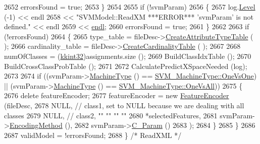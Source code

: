 \begin{DoxyCode}
2652     errorsFound = \textcolor{keyword}{true};
2653   \}
2654 
2655   \textcolor{keywordflow}{if}  (!svmParam)
2656   \{
2657    log.\hyperlink{class_k_k_b_1_1_run_log_a32cf761d7f2e747465fd80533fdbb659}{Level} (-1) << endl 
2658      << \textcolor{stringliteral}{"SVMModel::ReadXM   ***ERROR***   'svmParam' is not defined."} << endl
2659      << \hyperlink{namespace_k_k_b_ad1f50f65af6adc8fa9e6f62d007818a8}{endl};
2660     errorsFound = \textcolor{keyword}{true};
2661   \}
2662 
2663   \textcolor{keywordflow}{if}  (!errorsFound)
2664   \{
2665     type\_table        = fileDesc->\hyperlink{class_k_k_m_l_l_1_1_file_desc_a924736ac68c054c64001fe836ba7c1e3}{CreateAttributeTypeTable} ( );
2666     cardinality\_table = fileDesc->\hyperlink{class_k_k_m_l_l_1_1_file_desc_a1f16b3ad912b04745baa9eea8d3111c7}{CreateCardinalityTable} ( );
2667 
2668     numOfClasses = (\hyperlink{namespace_k_k_b_a8fa4952cc84fda1de4bec1fbdd8d5b1b}{kkint32})assignments.size ();
2669     BuildClassIdxTable ();
2670     BuildCrossClassProbTable ();
2671 
2672     CalculatePredictXSpaceNeeded (log);
2673 
2674     \textcolor{keywordflow}{if}  ((svmParam->\hyperlink{class_k_k_m_l_l_1_1_s_v_mparam_a30153e00007f9cf65343e0ad97ad61fb}{MachineType} () ==  \hyperlink{namespace_k_k_m_l_l_ad917464bc631109a3021cf02cd27af9aa2cb1a8e8122853731a8eb99f1bd56630}{SVM\_MachineType::OneVsOne})  ||  
      (svmParam->\hyperlink{class_k_k_m_l_l_1_1_s_v_mparam_a30153e00007f9cf65343e0ad97ad61fb}{MachineType} () == \hyperlink{namespace_k_k_m_l_l_ad917464bc631109a3021cf02cd27af9aa0bf7132f9ec5b2de535b831afd3ae75c}{SVM\_MachineType::OneVsAll}))
2675     \{
2676       \textcolor{keyword}{delete}  featureEncoder;
2677       featureEncoder = \textcolor{keyword}{new} \hyperlink{class_k_k_m_l_l_1_1_feature_encoder}{FeatureEncoder} (fileDesc,
2678                                            NULL,              \textcolor{comment}{// class1, set to NULL because we are dealing
       with all classes}
2679                                            NULL,              \textcolor{comment}{// class2,     ""          ""            ""  
                ""}
2680                                            *selectedFeatures,
2681                                            svmParam->\hyperlink{class_k_k_m_l_l_1_1_s_v_mparam_a64c242e8dc965631a3f3a95de555cd40}{EncodingMethod} (),
2682                                            svmParam->\hyperlink{class_k_k_m_l_l_1_1_s_v_mparam_ae370b8852451329cd5548b790ab5d65a}{C\_Param} ()
2683                                           );
2684     \}
2685   \}
2686 
2687   validModel = !errorsFound;
2688 \}  \textcolor{comment}{/* ReadXML */}
\end{DoxyCode}
